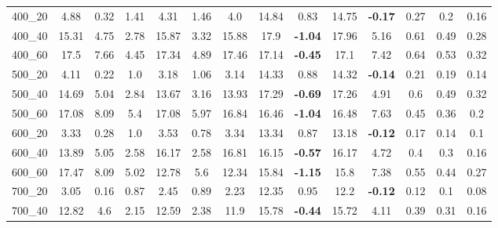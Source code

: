 \begin{tabular}{c|ccccccccccccc}
400\_20      & 4.88         & 0.32         & 1.41         & 4.31         & 1.46         & 4.0          & 14.84        & 0.83         & 14.75        & {\bf -0.17}  & 0.27         & 0.2          & 0.16         \\ 
400\_40      & 15.31        & 4.75         & 2.78         & 15.87        & 3.32         & 15.88        & 17.9         & {\bf -1.04}  & 17.96        & 5.16         & 0.61         & 0.49         & 0.28         \\ 
400\_60      & 17.5         & 7.66         & 4.45         & 17.34        & 4.89         & 17.46        & 17.14        & {\bf -0.45}  & 17.1         & 7.42         & 0.64         & 0.53         & 0.32         \\ 
500\_20      & 4.11         & 0.22         & 1.0          & 3.18         & 1.06         & 3.14         & 14.33        & 0.88         & 14.32        & {\bf -0.14}  & 0.21         & 0.19         & 0.14         \\ 
500\_40      & 14.69        & 5.04         & 2.84         & 13.67        & 3.16         & 13.93        & 17.29        & {\bf -0.69}  & 17.26        & 4.91         & 0.6          & 0.49         & 0.32         \\ 
500\_60      & 17.08        & 8.09         & 5.4          & 17.08        & 5.97         & 16.84        & 16.46        & {\bf -1.04}  & 16.48        & 7.63         & 0.45         & 0.36         & 0.2          \\ 
600\_20      & 3.33         & 0.28         & 1.0          & 3.53         & 0.78         & 3.34         & 13.34        & 0.87         & 13.18        & {\bf -0.12}  & 0.17         & 0.14         & 0.1          \\ 
600\_40      & 13.89        & 5.05         & 2.58         & 16.17        & 2.58         & 16.81        & 16.15        & {\bf -0.57}  & 16.17        & 4.72         & 0.4          & 0.3          & 0.16         \\ 
600\_60      & 17.47        & 8.09         & 5.02         & 12.78        & 5.6          & 12.34        & 15.84        & {\bf -1.15}  & 15.8         & 7.38         & 0.55         & 0.44         & 0.27         \\ 
700\_20      & 3.05         & 0.16         & 0.87         & 2.45         & 0.89         & 2.23         & 12.35        & 0.95         & 12.2         & {\bf -0.12}  & 0.12         & 0.1          & 0.08         \\ 
700\_40      & 12.82        & 4.6          & 2.15         & 12.59        & 2.38         & 11.9         & 15.78        & {\bf -0.44}  & 15.72        & 4.11         & 0.39         & 0.31         & 0.16         \\ 

\end{tabular}
